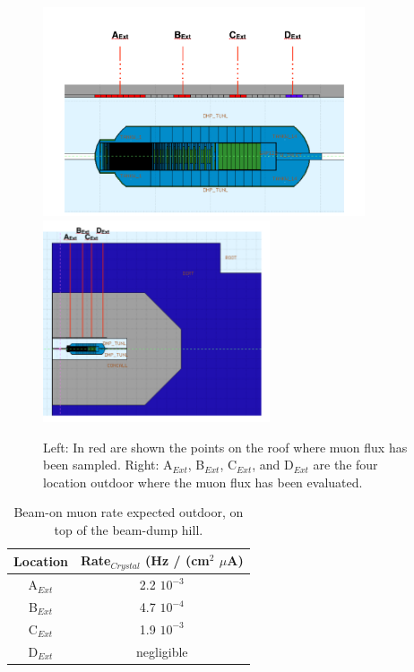\begin{figure}[h!] 
\center
\includegraphics[width=9.5cm]{figs/DumpTunnelTopBigger1.pdf}
\includegraphics[width=6.7cm]{figs/DumpTunnelTop1.pdf}
\caption {Left: In red are shown the points on the roof  where muon flux has been sampled. Right:  A$_{Ext}$, B$_{Ext}$, C$_{Ext}$,  and D$_{Ext}$ are the four location outdoor where the muon flux has been evaluated.}
\label{fig:bd-top}
\end{figure}


\begin{table}[htp]
\caption{Beam-on muon rate expected outdoor,  on top of the beam-dump hill.}
\begin{center}
\begin{tabular}{|c|c|}
\hline
Location &Rate$_{Crystal} $ (Hz / (cm$^2$ $\mu$A) \\
\hline\hline
A$_{Ext} $ & 2.2 $10^{-3}$\\
 \hline
B$_{Ext} $ & 4.7 $10^{-4}$\\
 \hline
C$_{Ext} $ & 1.9 $10^{-3}$\\
 \hline
D$_{Ext}$ & negligible\\

\hline\hline
\end{tabular}
\end{center}
\label{tab:outside}
\end{table}




